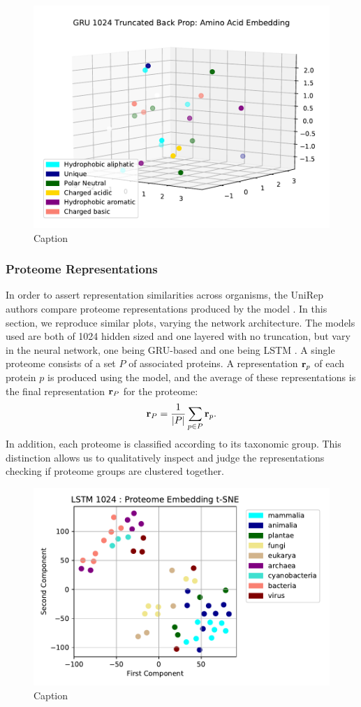 \documentclass[a4paper,12pt]{article}
\begin{document}
\begin{figure}[H]
    \centering
    \includegraphics[width=0.8\linewidth]{figures/fig2a_GRU_1024.pdf}
    \caption{Caption}
    \label{fig:fig2a_GRU}
\end{figure}

\subsubsection{Proteome Representations}

In order to assert representation similarities across organisms, the UniRep authors compare proteome representations produced by the model \cite{alley2019unified}. In this section, we reproduce similar plots, varying the network architecture. The models used are both of 1024 hidden sized and one layered with no truncation, but vary in the neural network, one being GRU-based and one being LSTM . A single proteome consists of a set $P$ of associated proteins. A representation $\mathbf{ r }_p$ of each protein $p$ is produced using the model, and the average of these representations is the final representation $\mathbf{ r }_P$ for the proteome:
\[ \mathbf{ r }_P = \frac{1}{|P|} \sum_{p \in P} \mathbf{ r }_p. \]
In addition, each proteome is classified according to its taxonomic group. This distinction allows us to qualitatively inspect and judge the representations checking if proteome groups are clustered together.

\begin{figure}[H]
    \centering
    \includegraphics[width=0.8\linewidth]{figures/fig2b_LSTM_1024_no_trunc.pdf}
    \caption{Caption}
    \label{fig:fig2b_LSTM}
\end{figure}
\end{document}
